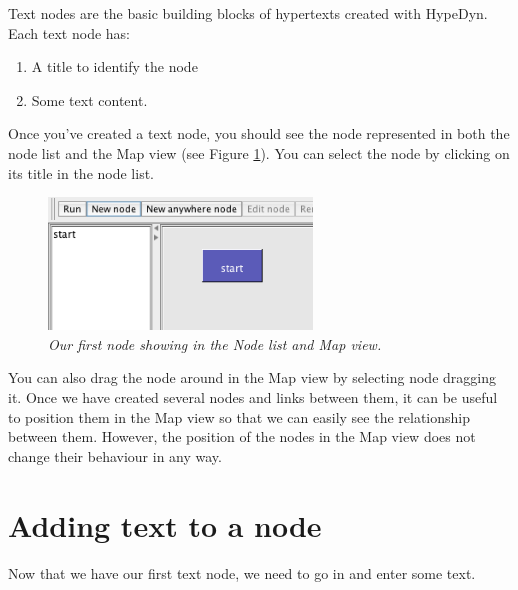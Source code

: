 \documentclass{article}
\begin{document}
Text nodes are the basic building blocks of hypertexts created with HypeDyn.
Each text node has: 
\begin{enumerate}
  \item A title to identify the node
  \item Some text content.
\end{enumerate}

Once you've created a text node, you should see the node represented in both the
node list and the Map view (see Figure \ref{fig:tut1:first_node}). You can select the
node by clicking on its title in the node list.
 
\begin{figure}[ht]
  \centering \includegraphics[width=7cm]{images/hypedyn-tutorial-1-figure-4}
  \caption{\textit{Our first node showing in the Node list and Map view.}}
  \label{fig:tut1:first_node}
\end{figure} 

You can also drag the node around in the Map view by selecting node dragging
it. Once we have created several nodes and links between them, it can be useful
to position them in the Map view so that we can easily see the relationship
between them. However, the position of the nodes in the Map view does
not change their behaviour in any way.

\section{Adding text to a node}

Now that we have our first text node, we need to go in and enter some text.
\end{document}
